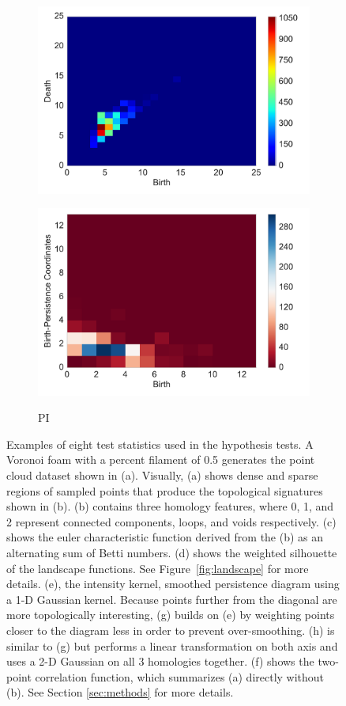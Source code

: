 \documentclass[12pt]{article}
\newcommand{\figref}[1]{Figure~\ref{#1}}
\begin{document}
\begin{figure}[htbp]
\begin{subfigure}{.24\textwidth}
        \includegraphics[width=\linewidth]{figure_5_intensity_fun.pdf}
    \label{fig:examplestest7}
  \end{subfigure}
    \begin{subfigure}{.24\textwidth}
    \centering
        \caption{PI}
        \includegraphics[width=\linewidth]{figure_5_pimage_fun.pdf}
    \label{fig:examplestest8}
  \end{subfigure}
   \caption{Examples of eight test statistics used in the hypothesis tests. A Voronoi foam with a percent filament of 0.5 generates the point cloud dataset shown in (a). Visually, (a) shows dense and sparse regions of sampled points that produce the topological signatures shown in (b). (b) contains three homology features, where 0, 1, and 2 represent connected components, loops, and voids respectively. (c) shows the euler characteristic function derived from the (b) as an alternating sum of Betti numbers. (d) shows the weighted silhouette of the landscape functions. See \figref{fig:landscape} for more details. (e), the intensity kernel, smoothed persistence diagram using a 1-D Gaussian kernel. Because points further from the diagonal are more topologically interesting, (g) builds on (e) by weighting points closer to the diagram less in order to prevent over-smoothing. (h) is similar to (g) but performs a linear transformation on both axis and uses a 2-D Gaussian on all 3 homologies together. (f) shows the two-point correlation function, which summarizes (a) directly without (b). See Section \ref{sec:methods} for more details.}

\end{figure}
\end{document}
